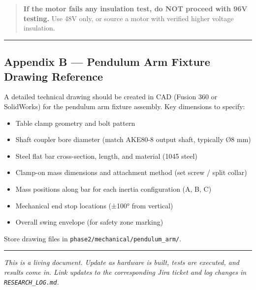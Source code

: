 \documentclass[
]{article}
\providecommand{\tightlist}{%
  \setlength{\itemsep}{0pt}\setlength{\parskip}{0pt}}
\begin{document}
\begin{quote}
\textbf{If the motor fails any insulation test, do NOT proceed with 96V
testing.} Use 48V only, or source a motor with verified higher voltage
insulation.
\end{quote}

\begin{center}\rule{0.5\linewidth}{0.5pt}\end{center}

\subsection{Appendix B --- Pendulum Arm Fixture Drawing
Reference}\label{appendix-b-pendulum-arm-fixture-drawing-reference}

A detailed technical drawing should be created in CAD (Fusion 360 or
SolidWorks) for the pendulum arm fixture assembly. Key dimensions to
specify:

\begin{itemize}
\tightlist
\item
  Table clamp geometry and bolt pattern
\item
  Shaft coupler bore diameter (match AKE80-8 output shaft, typically Ø8
  mm)
\item
  Steel flat bar cross-section, length, and material (1045 steel)
\item
  Clamp-on mass dimensions and attachment method (set screw / split
  collar)
\item
  Mass positions along bar for each inertia configuration (A, B, C)
\item
  Mechanical end stop locations (±100° from vertical)
\item
  Overall swing envelope (for safety zone marking)
\end{itemize}

Store drawing files in \texttt{phase2/mechanical/pendulum\_arm/}.

\begin{center}\rule{0.5\linewidth}{0.5pt}\end{center}

\emph{This is a living document. Update as hardware is built, tests are
executed, and results come in. Link updates to the corresponding Jira
ticket and log changes in \texttt{RESEARCH\_LOG.md}.}
\end{document}
